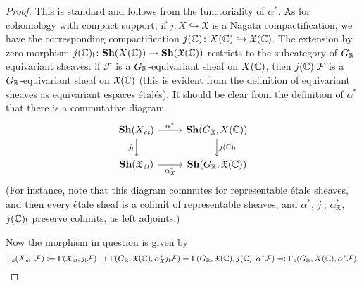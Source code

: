\documentclass{article}
\numberwithin{equation}{section}
\begin{document}
\begin{appendices}
\begin{proposition}
  \begin{proof}
    This is standard and follows from the functoriality of $\alpha^*$.
    As for cohomology with compact support, if
    $j\colon X \hookrightarrow \mathfrak{X}$ is a Nagata compactification,
    we have the corresponding compactification
    $j (\CC)\colon X (\CC) \hookrightarrow \mathfrak{X} (\CC)$. The extension by
    zero morphism
    $j (\CC)_!\colon \mathbf{Sh} (X (\CC)) \to \mathbf{Sh} (\mathfrak{X} (\CC))$
    restricts to the subcategory of $G_\RR$-equivariant sheaves:
    if $\mathcal{F}$ is a $G_\RR$-equivariant sheaf on $X (\CC)$, then
    $j (\CC)_!  \mathcal{F}$ is a $G_\RR$-equivariant sheaf on
    $\mathfrak{X} (\CC)$ (this is evident from the definition of equivariant
    sheaves as equivariant espaces étalés). It should be clear from the
    definition of $\alpha^*$ that there is a commutative diagram
    \[ \begin{tikzcd}
      \mathbf{Sh} (X_\et) \ar{r}{\alpha^*}\ar{d}[swap]{j_!} & \mathbf{Sh} (G_\RR, X (\CC)) \ar{d}{j (\CC)_!} \\
      \mathbf{Sh} (\mathfrak{X}_\et) \ar{r}[swap]{\alpha^*_\mathfrak{X}} & \mathbf{Sh} (G_\RR, \mathfrak{X} (\CC))
    \end{tikzcd} \]
    (For instance, note that this diagram commutes for representable étale
    sheaves, and then every étale sheaf is a colimit of representable sheaves,
    and $\alpha^*$, $j_!$, $\alpha^*_\mathfrak{X}$, $j (\CC)_!$ preserve
    colimits, as left adjoints.)

    Now the morphism in question is given by
    \[ \Gamma_c (X_\et, \mathcal{F}) \dfn \Gamma (\mathfrak{X}_\et, j_! \mathcal{F}) \to
    \Gamma (G_\RR, \mathfrak{X} (\CC), \alpha^*_\mathfrak{X} j_! \mathcal{F}) =
    \Gamma (G_\RR, \mathfrak{X} (\CC), j (\CC)_! \, \alpha^* \mathcal{F})
    \rdfn \Gamma_c (G_\RR, X (\CC), \alpha^* \mathcal{F}). \qedhere \]
  \end{proof}
\end{proposition}


\end{appendices}
\end{document}
